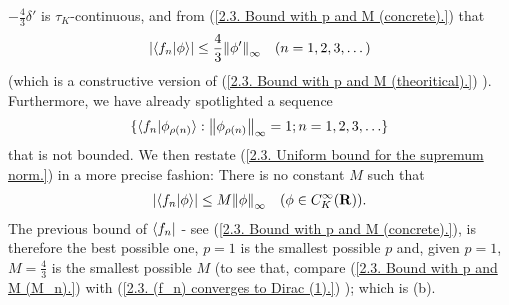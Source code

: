 %
  $\minus \frac{4}{3}\delta'$ is $\tau_K$-continuous,  %
%
and from %
%
  (\ref{2.3. Bound with p and M (concrete).}) %
%
that %
%
  \begin{align}
    \lvert \bra{f_n}\ket{\phi} \rvert \leq \frac{4}{3} \norm{\phi'}_{\infty} 
    \quad (n=1, 2, 3, \dots) 
  \end{align}
%
(which is a constructive version of %
%
  (\ref{2.3. Bound with p and M (theoritical).}) ). %
%
Furthermore, we have already spotlighted a sequence %
%
  \begin{align}
    \set{
      \langle{f_n} \lvert \phi_{\rho(n)} \rangle
    }{
      \norma{\infty}{\phi_{\rho(n)}} = 1; \counting{n}
    }
  \end{align}
%
that is not bounded. We then restate  %
%
  (\ref{2.3. Uniform bound for the supremum norm.}) %
%
in a more precise fashion: %
There is no constant $M$ such that %
%
  \begin{align}
    \lvert \langle f_n \lvert \phi \rangle \rvert \leq 
      M 
    \norm{\phi}_{\infty}
    \quad (\phi\in C_K^\infty({\mathbf R})).
  \end{align}
%
The previous bound of $\bra{f_n}$ %
%
  - see (\ref{2.3. Bound with p and M (concrete).}), 
%
is therefore the best possible one, \ie %
% 
    $p=1$ is the smallest possible $p$ and, given $p=1$,  %
    $M=\frac{4}{3}$ is the smallest possible $M$ %
    (to see that, compare %
      (\ref{2.3. Bound with p and M (M_n).}) with 
      (\ref{2.3. (f_n) converges to Dirac (1).})%
    ); which is (b). %
%
\newline\newline\noindent
%
